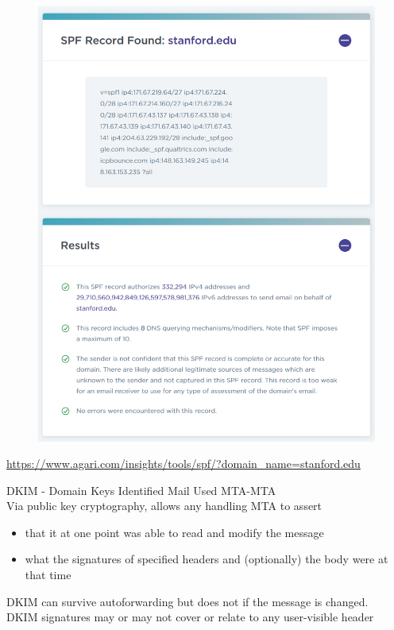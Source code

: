 \documentclass[nobackground,dvipsnames,table,aspectratio=169]{beamer}
\begin{document}
\begin{frame}{}
    \thispagestyle{empty}
    \begin{figure}
        \centering
        \includegraphics[height=\textheight]{spf-found}
    \end{figure}
    \url{https://www.agari.com/insights/tools/spf/?domain_name=stanford.edu}
\end{frame}

\begin{frame}{DKIM - Domain Keys Identified Mail}
    Used MTA-MTA\\
    Via public key cryptography, allows any handling MTA to assert
    \begin{itemize}
        \item that it at one point was able to read and modify the message
        \item what the signatures of specified headers and (optionally) the body were at that time
    \end{itemize}
    DKIM can survive autoforwarding but does not if the message is changed.\\
    DKIM signatures may or may not cover or relate to any user-visible header
\end{frame}
\end{document}
